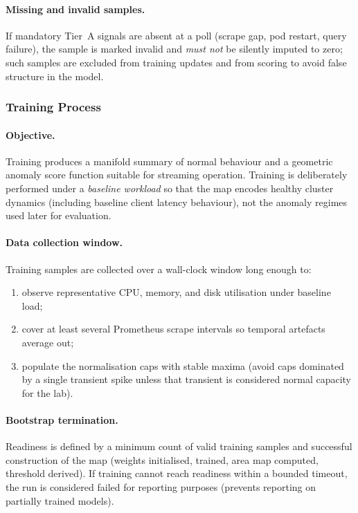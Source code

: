 \documentclass[sigconf]{acmart}
\begin{document}
\paragraph{Missing and invalid samples.}
If mandatory Tier~A signals are absent at a poll (scrape gap, pod restart, query failure), the sample is marked invalid and \emph{must not} be silently imputed to zero; such samples are excluded from training updates and from scoring to avoid false structure in the model.

%
\subsubsection{Training Process}
\label{subsubsec:som-train-process}

\paragraph{Objective.}
Training produces a manifold summary of normal behaviour and a geometric anomaly score function suitable for streaming operation. Training is deliberately performed under a \emph{baseline workload} so that the map encodes healthy cluster dynamics (including baseline client latency behaviour), not the anomaly regimes used later for evaluation.

\paragraph{Data collection window.}
Training samples are collected over a wall-clock window long enough to:
\begin{enumerate}
  \item observe representative CPU, memory, and disk utilisation under baseline load;
  \item cover at least several Prometheus scrape intervals so temporal artefacts average out;
  \item populate the normalisation caps with stable maxima (avoid caps dominated by a single transient spike unless that transient is considered normal capacity for the lab).
\end{enumerate}

\paragraph{Bootstrap termination.}
Readiness is defined by a minimum count of valid training samples and successful construction of the map (weights initialised, trained, area map computed, threshold derived). If training cannot reach readiness within a bounded timeout, the run is considered failed for reporting purposes (prevents reporting on partially trained models).
\end{document}
